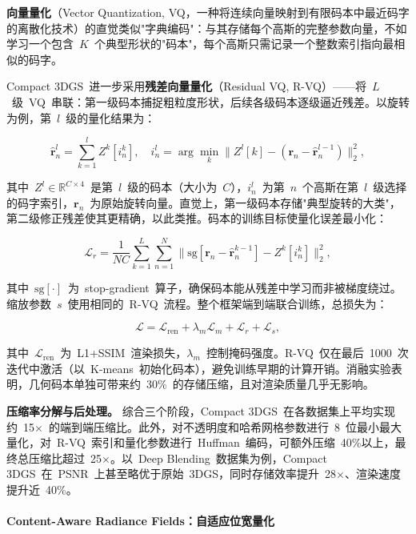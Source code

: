 \textbf{向量量化}（Vector Quantization, VQ，一种将连续向量映射到有限码本中最近码字的离散化技术）的直觉类似"字典编码"：与其存储每个高斯的完整参数向量，不如学习一个包含~$K$~个典型形状的"码本"，每个高斯只需记录一个整数索引指向最相似的码字。

Compact 3DGS~进一步采用\textbf{残差向量量化}（Residual VQ, R-VQ）——将~$L$~级~VQ~串联：第一级码本捕捉粗粒度形状，后续各级码本逐级逼近残差。以旋转为例，第~$l$~级的量化结果为：

\begin{equation}
    \hat{\mathbf{r}}_n^l = \sum_{k=1}^{l} Z^k[i_n^k], \quad i_n^l = \arg\min_k \|Z^l[k] - (\mathbf{r}_n - \hat{\mathbf{r}}_n^{l-1})\|_2^2,
\end{equation}

其中~$Z^l \in \mathbb{R}^{C \times 4}$~是第~$l$~级的码本（大小为~$C$），$i_n^l$~为第~$n$~个高斯在第~$l$~级选择的码字索引，$\mathbf{r}_n$~为原始旋转向量。直觉上，第一级码本存储"典型旋转的大类"，第二级修正残差使其更精确，以此类推。码本的训练目标使量化误差最小化：

\begin{equation}
    \mathcal{L}_r = \frac{1}{NC} \sum_{k=1}^{L} \sum_{n=1}^{N} \|\mathrm{sg}[\mathbf{r}_n - \hat{\mathbf{r}}_n^{k-1}] - Z^k[i_n^k]\|_2^2,
\end{equation}

其中~$\mathrm{sg}[\cdot]$~为~stop-gradient~算子，确保码本能从残差中学习而非被梯度绕过。缩放参数~$s$~使用相同的~R-VQ~流程。整个框架端到端联合训练，总损失为：

\begin{equation}
    \mathcal{L} = \mathcal{L}_{\mathrm{ren}} + \lambda_m \mathcal{L}_m + \mathcal{L}_r + \mathcal{L}_s,
\end{equation}

其中~$\mathcal{L}_{\mathrm{ren}}$~为~L1+SSIM~渲染损失，$\lambda_m$~控制掩码强度。R-VQ~仅在最后~1000~次迭代中激活（以~K-means~初始化码本），避免训练早期的计算开销。消融实验表明，几何码本单独可带来约~30\%~的存储压缩，且对渲染质量几乎无影响。

\textbf{压缩率分解与后处理。}
综合三个阶段，Compact 3DGS~在各数据集上平均实现约~15$\times$~的端到端压缩比。此外，对不透明度和哈希网格参数进行~8~位最小最大量化，对~R-VQ~索引和量化参数进行~Huffman~编码，可额外压缩~40\%以上，最终总压缩比超过~25$\times$。以~Deep Blending~数据集为例，Compact 3DGS~在~PSNR~上甚至略优于原始~3DGS，同时存储效率提升~28$\times$、渲染速度提升近~40\%。

\paragraph{Content-Aware Radiance Fields：自适应位宽量化}

